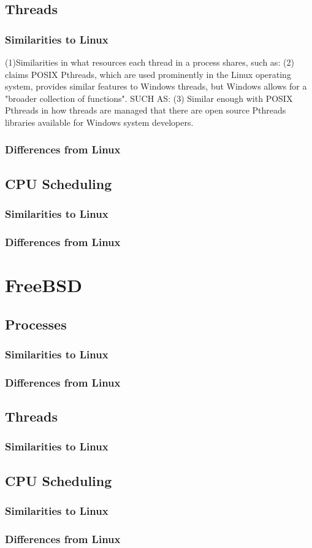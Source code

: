 \documentclass[letterpaper,10pt,titlepage]{article}
\begin{document}
\subsection{Threads}
\subsubsection{Similarities to Linux}
(1)Similarities in what resources each thread in a process shares, such as:
(2)\cite{har04} claims POSIX Pthreads, which are used prominently in the Linux operating system, provides similar features to Windows threads, but Windows allows for a "broader collection of functions". SUCH AS:
(3) Similar enough with POSIX Pthreads in how threads are managed that there are open source Pthreads libraries available for Windows system developers.
\subsubsection{Differences from Linux}
\subsection{CPU Scheduling}  
\subsubsection{Similarities to Linux}
\subsubsection{Differences from Linux}
\section{FreeBSD}
\subsection{Processes}
\subsubsection{Similarities to Linux}
\subsubsection{Differences from Linux}
\subsection{Threads}
\subsubsection{Similarities to Linux}
\subsection{CPU Scheduling}
\subsubsection{Similarities to Linux}
\subsubsection{Differences from Linux}

\newpage
{}

\end{document}
